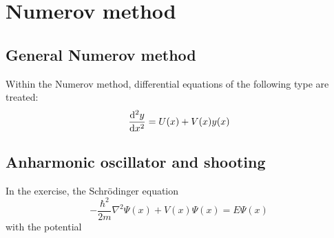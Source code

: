 \documentclass[../classnotes.tex]{subfiles}
\begin{document}
\chapter{Numerov method}

\section{General Numerov method}

Within the Numerov method, differential equations of the following type are treated:
\begin{equation}
    \odv[order=2]{y}{x} = U(x) + V(x) y(x)
\end{equation}

\section{Anharmonic oscillator and shooting}

In the exercise, the Schrödinger equation
\begin{equation}
    -\frac{\hbar^2}{2m} \nabla^2 \Psi(x) + V(x) \Psi(x) = E \Psi(x)
\end{equation}
with the potential
\end{document}
